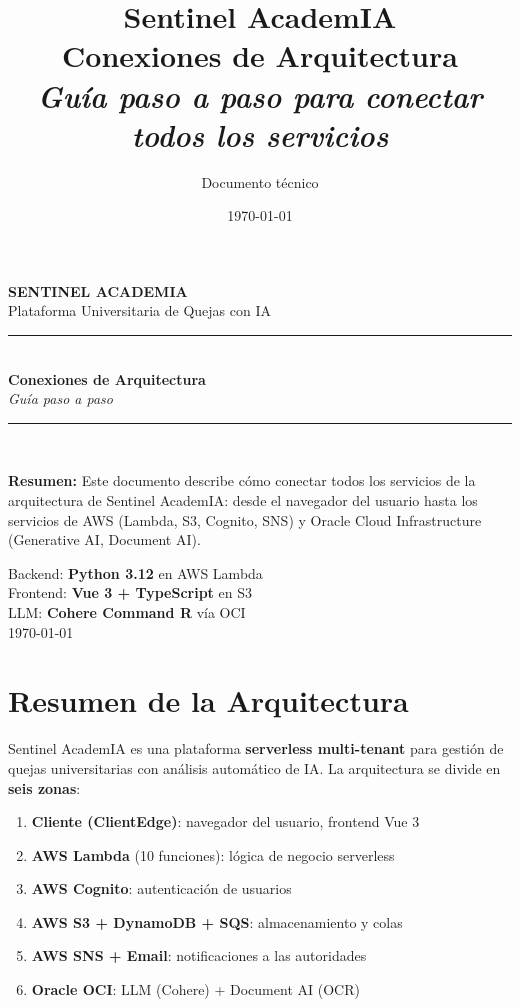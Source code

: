 \documentclass[11pt,a4paper]{article}
\title{\Huge\bfseries Sentinel AcademIA \\[0.3cm]
       \Large Conexiones de Arquitectura \\
       \large\textit{Guía paso a paso para conectar todos los servicios}}
\author{Documento técnico}
\date{\today}
\begin{document}
\begin{titlepage}
\centering
\vspace*{2cm}
{\Huge\bfseries SENTINEL ACADEMIA}\\[0.5cm]
{\Large Plataforma Universitaria de Quejas con IA}\\[2cm]

\rule{\textwidth}{1pt}\\[0.5cm]
{\huge\bfseries Conexiones de Arquitectura}\\[0.3cm]
{\Large\textit{Guía paso a paso}}\\[0.5cm]
\rule{\textwidth}{1pt}\\[2cm]

\begin{tcolorbox}[colback=lightbg, colframe=accent, width=0.85\textwidth, arc=3mm]
\textbf{Resumen:} Este documento describe cómo conectar todos los servicios
de la arquitectura de Sentinel AcademIA: desde el navegador del usuario
hasta los servicios de AWS (Lambda, S3, Cognito, SNS) y Oracle Cloud
Infrastructure (Generative AI, Document AI).
\end{tcolorbox}

\vspace{1cm}
{\large Backend: \textbf{Python 3.12} en AWS Lambda} \\
{\large Frontend: \textbf{Vue 3 + TypeScript} en S3} \\
{\large LLM: \textbf{Cohere Command R} vía OCI} \\[1cm]
{\large \today}
\end{titlepage}

\tableofcontents
\newpage

\section{Resumen de la Arquitectura}

Sentinel AcademIA es una plataforma \textbf{serverless multi-tenant} para
gestión de quejas universitarias con análisis automático de IA.
La arquitectura se divide en \textbf{seis zonas}:

\begin{enumerate}[leftmargin=*]
  \item \textbf{Cliente (ClientEdge)}: navegador del usuario, frontend Vue 3
  \item \textbf{AWS Lambda} (10 funciones): lógica de negocio serverless
  \item \textbf{AWS Cognito}: autenticación de usuarios
  \item \textbf{AWS S3 + DynamoDB + SQS}: almacenamiento y colas
  \item \textbf{AWS SNS + Email}: notificaciones a las autoridades
  \item \textbf{Oracle OCI}: LLM (Cohere) + Document AI (OCR)
\end{enumerate}
\end{document}

